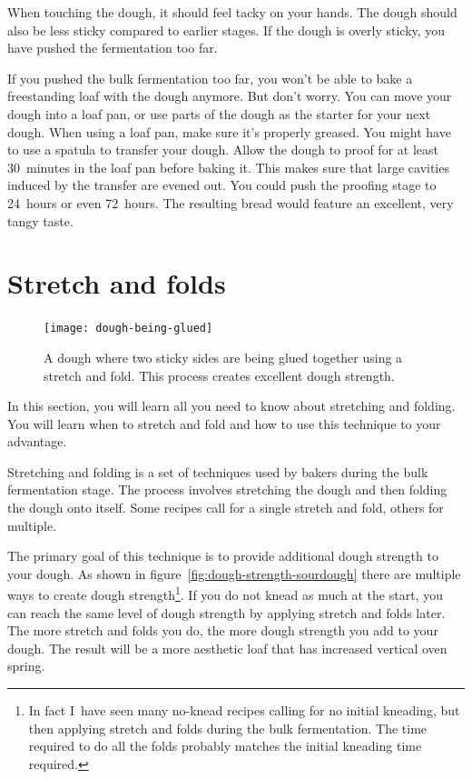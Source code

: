 When touching the dough, it should feel tacky
on your hands. The dough should also be less sticky
compared to earlier stages. If the dough is overly
sticky, you have pushed the fermentation too far.

If you pushed the bulk fermentation too far, you won't be able
to bake a freestanding loaf with the dough anymore. But don't
worry. You can move your dough into a loaf pan, or use parts
of the dough as the starter for your next dough. When using
a loaf pan, make sure it's properly greased. You might have
to use a spatula to transfer your dough. Allow the dough
to proof for at least 30~minutes in the loaf pan before
baking it. This makes sure that large cavities induced
by the transfer are evened out. You could push the proofing
stage to 24~hours or even 72~hours. The resulting
bread would feature an excellent, very tangy taste.


\section{Stretch and folds}

\begin{figure}[!htb]
  \texttt{[image: dough-being-glued]}
  \caption[Gluing dough]{A dough where two sticky sides are being glued
      together using a stretch and fold. This process creates excellent dough
      strength.}
\end{figure}

In this section, you will learn all you need to know about stretching and
folding. You will learn when to stretch and fold and how to use this technique
to your advantage.

Stretching and folding is a set of techniques used by bakers during the bulk
fermentation stage. The process involves stretching the dough and then
folding the dough onto itself. Some recipes call for a single stretch
and fold, others for multiple.

The primary goal of this technique is to provide
additional dough strength to your dough. As shown in figure~\ref{fig:dough-strength-sourdough}
there are multiple ways to create dough strength\footnote{In fact I~have seen many no-knead
recipes calling for no initial kneading, but then applying stretch and folds
during the bulk fermentation. The time required to do all the folds probably
matches the initial kneading time required.}. If you do not knead as much at
the start, you can reach the same level of dough strength by applying stretch
and folds later. The more stretch and folds you do, the more dough strength
you add to your dough. The result will be a more aesthetic loaf that has
increased vertical oven spring.

